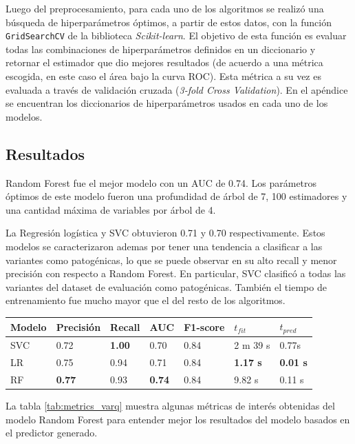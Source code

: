 Luego del preprocesamiento, para cada uno de los algoritmos se realizó una búsqueda de hiperparámetros óptimos, a partir de estos datos, con la función \texttt{GridSearchCV} de la biblioteca \textit{Scikit-learn}. El objetivo de esta función es evaluar todas las combinaciones de hiperparámetros definidos en un diccionario y retornar el estimador que dio mejores resultados (de acuerdo a una métrica escogida, en este caso el área bajo la curva ROC). Esta métrica a su vez es evaluada a través de validación cruzada (\textit{3-fold Cross Validation}). En el apéndice se encuentran los diccionarios de hiperparámetros usados en cada uno de los modelos.

\subsection{Resultados}

Random Forest fue el mejor modelo con un AUC de 0.74. Los parámetros óptimos de este modelo fueron una profundidad de árbol de 7, 100 estimadores y una cantidad máxima de variables por árbol de 4.

La Regresión logística y SVC obtuvieron 0.71 y 0.70 respectivamente. Estos modelos se caracterizaron ademas por tener una tendencia a clasificar a las variantes como patogénicas, lo que se puede observar en su alto recall y menor precisión con respecto a Random Forest. En particular, SVC clasificó a todas las variantes del dataset de evaluación como patogénicas. También el tiempo de entrenamiento fue mucho mayor que el del resto de los algoritmos.

\begin{table}[H]
\centering
\begin{tabular}{|l|l|l|l|l|l|l|}
\hline
Modelo & Precisión & Recall & AUC & F1-score & $t_{fit}$ & $t_{pred}$ \\ \hline
SVC    & 0.72 & \textbf{1.00} & 0.70 & 0.84 & 2 m 39 s & 0.77s \\ \hline
LR     & 0.75 & 0.94 & 0.71 & 0.84 & \textbf{1.17 s} & \textbf{0.01 s} \\ \hline
RF     & \textbf{0.77} & 0.93 & \textbf{0.74} & 0.84 & 9.82 s & 0.11 s \\ \hline
\end{tabular}
\label{tab:metrics_model}
\end{table}




La tabla \ref{tab:metrics_varq} muestra algunas métricas de interés obtenidas del modelo Random Forest para entender mejor los resultados del modelo basados en el predictor generado.



